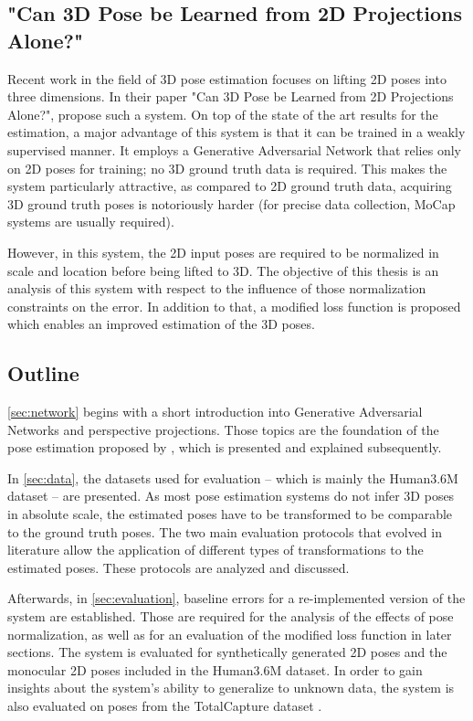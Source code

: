\subsection{"Can 3D Pose be Learned from 2D Projections Alone?"}

Recent work in the field of 3D pose estimation focuses on lifting 2D poses into three dimensions. 
In their paper "Can 3D Pose be Learned from 2D Projections Alone?", \citet{drover18} propose such a system.
On top of the state of the art results for the estimation, a major advantage of this system is that it can be trained in a weakly supervised manner.
It employs a Generative Adversarial Network \cite{goodfellow14} that relies only on 2D poses for training; no 3D ground truth data is required.
This makes the system particularly attractive, as compared to 2D ground truth data, acquiring 3D ground truth poses is notoriously harder (for precise data collection, MoCap systems are usually required).

However, in this system, the 2D input poses are required to be normalized in scale and location before being lifted to 3D.
The objective of this thesis is an analysis of this system with respect to the influence of those normalization constraints on the error.
In addition to that, a modified loss function is proposed which enables an improved estimation of the 3D poses.

\subsection{Outline}

\autoref{sec:network} begins with a short introduction into Generative Adversarial Networks and perspective projections.
Those topics are the foundation of the pose estimation proposed by \citet{drover18}, which is presented and explained subsequently.

In \autoref{sec:data}, the datasets used for evaluation -- which is mainly the Human3.6M dataset \cite{ionescu14} -- are presented.
As most pose estimation systems do not infer 3D poses in absolute scale, the estimated poses have to be transformed to be comparable to the ground truth poses.
The two main evaluation protocols that evolved in literature allow the application of different types of transformations to the estimated poses.
These protocols are analyzed and discussed.

Afterwards, in \autoref{sec:evaluation}, baseline errors for a re-implemented version of the system are established.
Those are required for the analysis of the effects of pose normalization, as well as for an evaluation of the modified loss function in later sections.
The system is evaluated for synthetically generated 2D poses and the monocular 2D poses included in the Human3.6M dataset.
In order to gain insights about the system's ability to generalize to unknown data, the system is also evaluated on poses from the TotalCapture dataset \cite{trumble17}.

